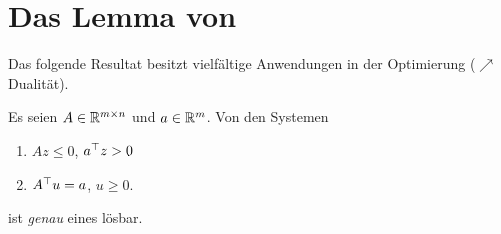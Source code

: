 \section{Das Lemma von }

Das folgende Resultat besitzt vielfältige Anwendungen in der Optimierung ($\nearrow$ Dualität).

\begin{lemma}[Farkas] %
	Es seien $A \in \mathbb{R}^{m \times n}$ und $a \in \mathbb{R}^m$.  Von den Systemen
	\begin{enumerate}[label=(\roman*), nolistsep, topsep=-\parskip]
		\item $Az \le 0$, $a^{\top} z > 0$
		\item $A^{\top} u = a$, $u \ge 0$.
	\end{enumerate}
	ist \textit{genau} eines lösbar.
\end{lemma}
